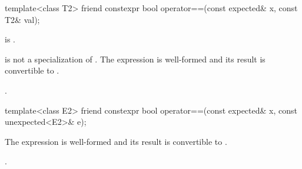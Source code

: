 %
\begin{itemdecl}
template<class T2> friend constexpr bool operator==(const expected& x, const T2& val);
\end{itemdecl}

\begin{itemdescr}
\pnum
\constraints
{} is .

\pnum
\mandates
{} is not a specialization of . The expression  is well-formed and its result is convertible to .

\pnum
\returns
{}.
\end{itemdescr}

%
\begin{itemdecl}
template<class E2>
friend constexpr bool operator==(const expected& x, const unexpected<E2>& e);
\end{itemdecl}

\begin{itemdescr}
\pnum
\mandates
The expression  is well-formed and its result is convertible to .

\pnum
\returns
{}.
\end{itemdescr}
